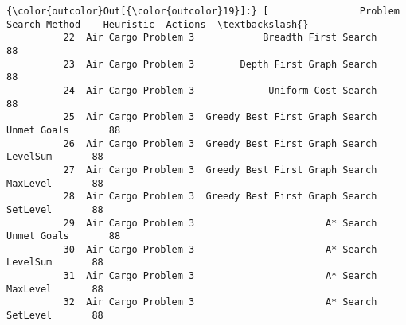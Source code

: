 \documentclass[11pt]{article}
\begin{document}
\begin{Verbatim}[commandchars=\\\{\}]
{\color{outcolor}Out[{\color{outcolor}19}]:} [                Problem                   Search Method    Heuristic  Actions  \textbackslash{}
          22  Air Cargo Problem 3            Breadth First Search                    88   
          23  Air Cargo Problem 3        Depth First Graph Search                    88   
          24  Air Cargo Problem 3             Uniform Cost Search                    88   
          25  Air Cargo Problem 3  Greedy Best First Graph Search  Unmet Goals       88   
          26  Air Cargo Problem 3  Greedy Best First Graph Search     LevelSum       88   
          27  Air Cargo Problem 3  Greedy Best First Graph Search     MaxLevel       88   
          28  Air Cargo Problem 3  Greedy Best First Graph Search     SetLevel       88   
          29  Air Cargo Problem 3                       A* Search  Unmet Goals       88   
          30  Air Cargo Problem 3                       A* Search     LevelSum       88   
          31  Air Cargo Problem 3                       A* Search     MaxLevel       88   
          32  Air Cargo Problem 3                       A* Search     SetLevel       88   
          

\end{Verbatim}
\end{document}
